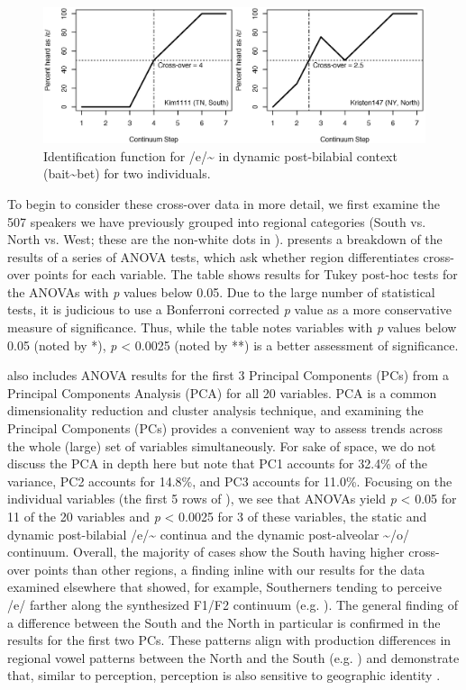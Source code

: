 \documentclass[output=paper]{LSP/langsci}
\begin{document}
\begin{figure}
\includegraphics[width=\textwidth]{illustrations/kend_frid_fig2}
\caption{Identification function for /e/\~{}
in dynamic post-bilabial context (bait\~{}bet) for two individuals.}
\label{fig:2}
\end{figure}

To begin to consider these cross-over data in more detail, we first examine the 507 speakers we have previously grouped into regional categories (South vs. North vs. West; these are the non-white dots in ).  presents a breakdown of the results of a series of ANOVA tests, which ask whether region differentiates cross-over points for each variable. The table shows results for Tukey post-hoc tests for the ANOVAs with \textit{p }values below 0.05. Due to the large number of statistical tests, it is judicious to use a Bonferroni corrected \textit{p }value as a more conservative measure of significance. Thus, while the table notes variables with \textit{p }values below 0.05 (noted by *), \textit{p }{\textless} 0.0025 (noted by **) is a better assessment of significance.

 also includes ANOVA results for the first 3 Principal Components (PCs) from a Principal Components Analysis (PCA) for all 20 variables. PCA is a common dimensionality reduction and cluster analysis technique, and examining the Principal Components (PCs) provides a convenient way to assess trends across the whole (large) set of variables simultaneously. For sake of space, we do not discuss the PCA in depth here but note that PC1 accounts for 32.4\% of the variance, PC2 accounts for 14.8\%, and PC3 accounts for 11.0\%. Focusing on the individual variables (the first 5 rows of ), we see that ANOVAs yield \textit{p }{\textless} 0.05 for 11 of the 20 variables and \textit{p }{\textless} 0.0025 for 3 of these variables, the static and dynamic post-bilabial /e/\~{}
continua and the dynamic post-alveolar 
\~{}/o/ continuum. Overall, the majority of cases show the South having higher cross-over points than other regions, a finding inline with our results for the data examined elsewhere that showed, for example, Southerners tending to perceive /e/ farther along the synthesized F1/F2 continuum (e.g. \citealt{kendall_variation_2012}). The general finding of a difference between the South and the North in particular is confirmed in the results for the first two PCs. These patterns align with production differences in regional vowel patterns between the North and the South (e.g. \cite{labov_atlas_2006-1}) and demonstrate that, similar to perception, perception is also sensitive to geographic identity \citep{fridland_exploring_2012}.
\end{document}
